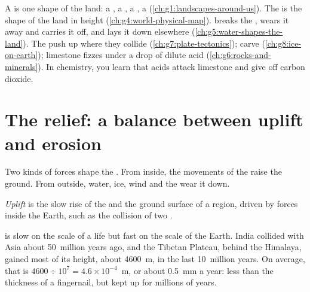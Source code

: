 \begin{recall}
A \emph{} is one shape of the land: a , a , a , a
 (\cref{ch:g1:landscapes-around-us}). The  is the shape of the
land in height (\cref{ch:g4:world-physical-map}).  breaks the
,  wears it away and carries it off, and  lays it
down elsewhere (\cref{ch:g5:water-shapes-the-land}). The  push up
 where they collide (\cref{ch:g7:plate-tectonics}); 
carve  (\cref{ch:g8:ice-on-earth}); limestone fizzes under
a drop of dilute acid (\cref{ch:g6:rocks-and-minerals}). In chemistry, you
learn that acids attack limestone and give off carbon dioxide.
\end{recall}

\section{The relief: a balance between uplift and erosion}

Two kinds of forces shape the . From inside, the movements of the
 raise the ground. From outside, water, ice, wind and the  wear it
down.

\begin{definition}[Uplift]\label{def:g9:landforms:uplift}
\emph{Uplift} is the slow rise of the  and the ground
surface of a region, driven by forces inside the Earth, such as the
collision of two .
\end{definition}

 is slow on the scale of a life but fast on the scale of the Earth.
India collided with Asia about 50~million years ago, and the Tibetan
Plateau, behind the Himalaya, gained most of its height, about
\qty{4600}{m}, in the last 10~million years. On average, that is
$4600 \div 10^7 = 4.6 \times 10^{-4}$~m, or about \qty{0.5}{mm} a year:
less than the thickness of a fingernail, but kept up for millions of years.

